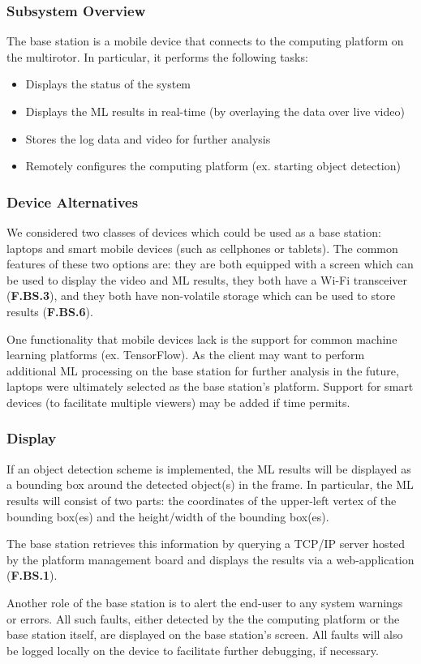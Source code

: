 \subsubsection{Subsystem Overview}

The base station is a mobile device that connects to the computing platform on the multirotor. In particular, it performs the following tasks:
\begin{itemize}
    \item Displays the status of the system
    \item Displays the ML results in real-time (by overlaying the data over live video)
    \item Stores the log data and video for further analysis
    \item Remotely configures the computing platform (ex. starting object detection)
\end{itemize}

\subsubsection{Device Alternatives}
We considered two classes of devices which could be used as a base station: laptops and smart mobile devices (such as cellphones or tablets). The common features of these two options are: they are both equipped with a screen which can be used to display the video and ML results, they both have a Wi-Fi transceiver (\textbf{F.BS.3}), and they both have non-volatile storage which can be used to store results (\textbf{F.BS.6}).

One functionality that mobile devices lack is the support for common machine learning platforms (ex. TensorFlow). As the client may want to perform additional ML processing on the base station for further analysis in the future, laptops were ultimately selected as the base station's platform. Support for smart devices (to facilitate multiple viewers) may be added if time permits.

\subsubsection{Display}

If an object detection scheme is implemented, the ML results will be displayed as a bounding box around the detected object(s) in the frame. In particular, the ML results will consist of two parts: the coordinates of the upper-left vertex of the bounding box(es) and the height/width of the bounding box(es). 

The base station retrieves this information by querying a TCP/IP server hosted by the platform management board and displays the results via a web-application (\textbf{F.BS.1}).

Another role of the base station is to alert the end-user to any system warnings or errors. All such faults, either detected by the the computing platform or the base station itself, are displayed on the base station's screen. All faults will also be logged locally on the device to facilitate further debugging, if necessary.
